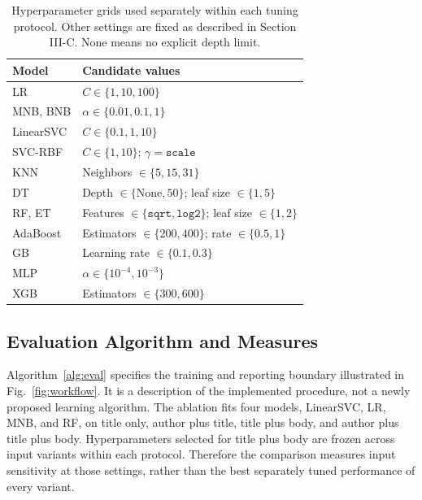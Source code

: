 \documentclass[conference]{IEEEtran}
\newcounter{algorithm}
\begin{document}
\begin{table}[t]
\caption{Hyperparameter grids used separately within each tuning protocol. Other settings are fixed as described in Section III-C. None means no explicit depth limit.}
\label{tab:grid}\centering\small
\begin{tabular}{lp{5.7cm}}\toprule
Model & Candidate values\\\midrule
LR & $C\in\{1,10,100\}$\\
MNB, BNB & $\alpha\in\{0.01,0.1,1\}$\\
LinearSVC & $C\in\{0.1,1,10\}$\\
SVC-RBF & $C\in\{1,10\}$; $\gamma=\texttt{scale}$\\
KNN & Neighbors $\in\{5,15,31\}$\\
DT & Depth $\in\{\text{None},50\}$; leaf size $\in\{1,5\}$\\
RF, ET & Features $\in\{\texttt{sqrt},\texttt{log2}\}$; leaf size $\in\{1,2\}$\\
AdaBoost & Estimators $\in\{200,400\}$; rate $\in\{0.5,1\}$\\
GB & Learning rate $\in\{0.1,0.3\}$\\
MLP & $\alpha\in\{10^{-4},10^{-3}\}$\\
XGB & Estimators $\in\{300,600\}$\\\bottomrule
\end{tabular}
\end{table}

\subsection{Evaluation Algorithm and Measures}
Algorithm~\ref{alg:eval} specifies the training and reporting boundary illustrated in Fig.~\ref{fig:workflow}. It is a description of the implemented procedure, not a newly proposed learning algorithm. The ablation fits four models, LinearSVC, LR, MNB, and RF, on title only, author plus title, title plus body, and author plus title plus body. Hyperparameters selected for title plus body are frozen across input variants within each protocol. Therefore the comparison measures input sensitivity at those settings, rather than the best separately tuned performance of every variant.
\end{document}
